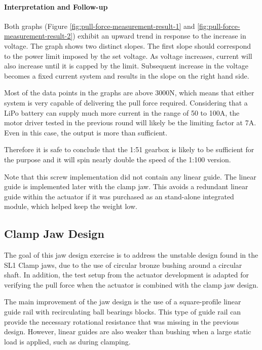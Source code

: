 \FloatBarrier

\paragraph{Interpretation and Follow-up}

Both graphs (Figure \ref{fig:pull-force-measurement-result-1} and \ref{fig:pull-force-measurement-result-2}) exhibit an upward trend in response to the increase in voltage. The graph shows two distinct slopes. The first slope should correspond to the power limit imposed by the set voltage. As voltage increases, current will also increase until it is capped by the limit. Subsequent increase in the voltage becomes a fixed current system and results in the slope on the right hand side.

Most of the data points in the graphs are above 3000N, which means that either system is very capable of delivering the pull force required. Considering that a LiPo battery can supply much more current in the range of 50 to 100A, the motor driver tested in the previous round will likely be the limiting factor at 7A. Even in this case, the output is more than sufficient. 

Therefore it is safe to conclude that the 1:51 gearbox is likely to be sufficient for the purpose and it will spin nearly double the speed of the 1:100 version.

Note that this screw implementation did not contain any linear guide. The linear guide is implemented later with the clamp jaw. This avoids a redundant linear guide within the actuator if it was purchased as an stand-alone integrated module, which helped keep the weight low.  

\subsection{Clamp Jaw Design}
\label{subsection:exploration-2-clamp-jaw-design}

The goal of this jaw design exercise is to address the unstable design found in the SL1 Clamp jaws, due to the use of circular bronze bushing around a circular shaft. In addition, the test setup from the actuator development is adapted for verifying the pull force when the actuator is combined with the clamp jaw design.

The main improvement of the jaw design is the use of a square-profile linear guide rail with recirculating ball bearings blocks. This type of guide rail can provide the necessary rotational resistance that was missing in the previous design. However, linear guides are also weaker than bushing when a large static load is applied, such as during clamping.

